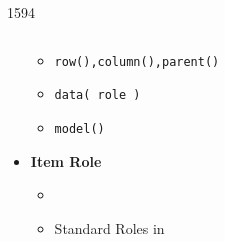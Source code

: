\begin{slide}{1594}
\begin{columns}
\begin{column}{55mm}
\begin{itemize}
\begin{itemize}
      \item \texttt{row(),column(),parent()}
      \item \texttt{data( role )}
      \item \texttt{model()}
      \end{itemize}
    \item \textbf{Item Role}
      \begin{itemize}
      \item {}
      \item Standard Roles in 
      \end{itemize}
   \end{itemize}
  \end{column}
\end{columns}
\end{slide}
